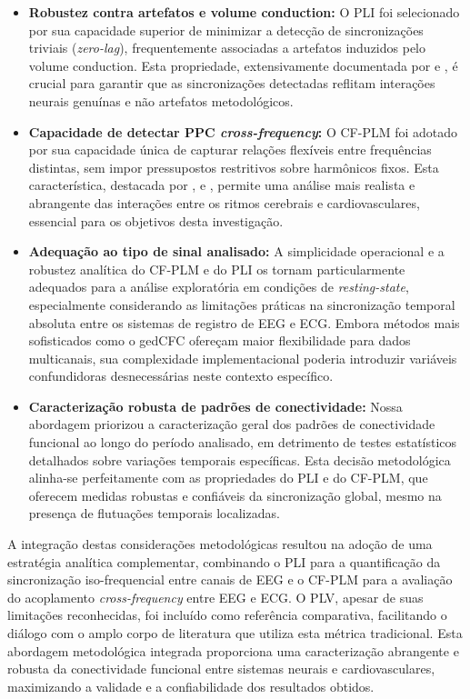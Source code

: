 \begin{itemize}
  \item \textbf{Robustez contra artefatos e volume conduction:} O PLI foi selecionado por sua capacidade superior de minimizar a detecção de sincronizações triviais (\textit{zero-lag}), frequentemente associadas a artefatos induzidos pelo volume conduction. Esta propriedade, extensivamente documentada por  e , é crucial para garantir que as sincronizações detectadas reflitam interações neurais genuínas e não artefatos metodológicos.

  \item \textbf{Capacidade de detectar PPC \textit{cross-frequency}:} O CF-PLM foi adotado por sua capacidade única de capturar relações flexíveis entre frequências distintas, sem impor pressupostos restritivos sobre harmônicos fixos. Esta característica, destacada por ,  e , permite uma análise mais realista e abrangente das interações entre os ritmos cerebrais e cardiovasculares, essencial para os objetivos desta investigação.

  \item \textbf{Adequação ao tipo de sinal analisado:} A simplicidade operacional e a robustez analítica do CF-PLM e do PLI os tornam particularmente adequados para a análise exploratória em condições de \textit{resting-state}, especialmente considerando as limitações práticas na sincronização temporal absoluta entre os sistemas de registro de EEG e ECG. Embora métodos mais sofisticados como o gedCFC ofereçam maior flexibilidade para dados multicanais, sua complexidade implementacional poderia introduzir variáveis confundidoras desnecessárias neste contexto específico.

  \item \textbf{Caracterização robusta de padrões de conectividade:} Nossa abordagem priorizou a caracterização geral dos padrões de conectividade funcional ao longo do período analisado, em detrimento de testes estatísticos detalhados sobre variações temporais específicas. Esta decisão metodológica alinha-se perfeitamente com as propriedades do PLI e do CF-PLM, que oferecem medidas robustas e confiáveis da sincronização global, mesmo na presença de flutuações temporais localizadas.
\end{itemize}

A integração destas considerações metodológicas resultou na adoção de uma estratégia analítica complementar, combinando o PLI para a quantificação da sincronização iso-frequencial entre canais de EEG e o CF-PLM para a avaliação do acoplamento \textit{cross-frequency} entre EEG e ECG. O PLV, apesar de suas limitações reconhecidas, foi incluído como referência comparativa, facilitando o diálogo com o amplo corpo de literatura que utiliza esta métrica tradicional. Esta abordagem metodológica integrada proporciona uma caracterização abrangente e robusta da conectividade funcional entre sistemas neurais e cardiovasculares, maximizando a validade e a confiabilidade dos resultados obtidos.


